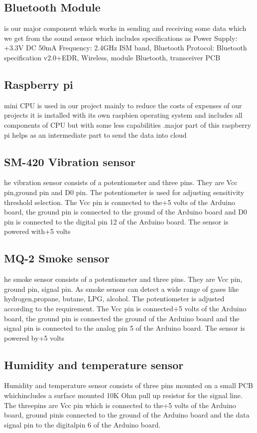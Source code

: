 \subsection{Bluetooth Module} is our major component which works in sending and receiving some data which we get from the sound sensor which includes specifications as Power Supply: +3.3V DC 50mA Frequency: 2.4GHz ISM band, Bluetooth Protocol: Bluetooth specification v2.0+EDR, Wireless, module Bluetooth, transceiver PCB
\subsection{Raspberry pi} mini CPU is used in our project mainly to reduce the costs of expenses of our projects it is installed with its own raspbien operating system and includes all components of CPU but with some less capabilities .major part of this raspberry pi helps as an intermediate part to send the data into cloud
\subsection{SM-420 Vibration sensor }
he vibration sensor consists of a potentiometer and three pins.   They are Vcc pin,ground pin and D0 pin.  The potentiometer is used for adjusting sensitivity threshold selection.  The Vcc pin is connected to the+5 volts of the Arduino board, the ground pin is connected to the ground of the Arduino board and D0 pin is connected to the digital pin 12 of the Arduino board. The sensor is powered with+5 volts
\subsection{MQ-2 Smoke sensor }
he smoke sensor consists of a potentiometer and three pins. They are Vcc pin, ground pin,  signal  pin.   As  smoke  sensor  can  detect  a  wide  range  of  gases  like  hydrogen,propane,  butane,  LPG,  alcohol. The potentiometer  is  adjusted  according  to  the  requirement.  The Vcc pin is connected+5 volts of the Arduino board, the ground pin is connected the ground of the Arduino board and the signal pin is connected to the analog pin 5 of the Arduino board. The sensor is powered by+5 volts
\subsection{ Humidity and temperature sensor }
Humidity and temperature sensor consists of three pins mounted on a small PCB whichincludes a surface mounted 10K Ohm pull up resistor for the signal line.  The threepins are Vcc pin which is connected to the+5 volts of the Arduino board, ground pinis connected to the ground of the Arduino board and the data signal pin to the digitalpin 6 of the Arduino board.
